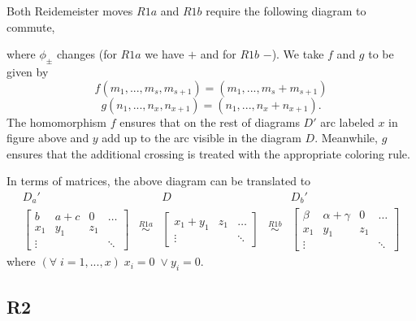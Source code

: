 Both Reidemeister moves $R1a$ and $R1b$ require the following diagram to commute,
\begin{center}
\end{center}
where $\phi_\pm$ changes (for $R1a$ we have $+$ and for $R1b$ $-$). We take $f$ and $g$ to be given by
$$f(m_1,..., m_s, m_{s+1})=(m_1,..., m_s+m_{s+1})$$
$$g(n_1,..., n_x, n_{x+1})=(n_1,..., n_x+n_{x+1}).$$
The homomorphism $f$ ensures that on the rest of diagrams $D'$ arc labeled $x$ in figure above and $y$ add up to the arc visible in the diagram $D$. Meanwhile, $g$ ensures that the additional crossing is treated with the appropriate coloring rule.

In terms of matrices, the above diagram can be translated to
$$
\begin{matrix}
  D_a' & & D & & D_b'\\ 
  \begin{bmatrix}
    b & a+c  & 0 & \hdots\\ 
    x_1 & y_1 & z_1 \\ 
    \vdots & & & \ddots
  \end{bmatrix} 
       & \overset{R1a}{\sim} &
     \begin{bmatrix}
       x_1 + y_1 & z_1 & \hdots\\ 
       \vdots & & \ddots
     \end{bmatrix} 
       & \overset{R1b}{\sim} &
  \begin{bmatrix}
    \beta & \alpha+\gamma  & 0 & \hdots\\ 
    x_1 & y_1 & z_1 \\ 
    \vdots & & & \ddots
  \end{bmatrix} 
\end{matrix}
$$
where $(\forall\;i=1,...,x)\;x_i=0\;\lor y_i=0$.

\subsection*{\centering R2}

